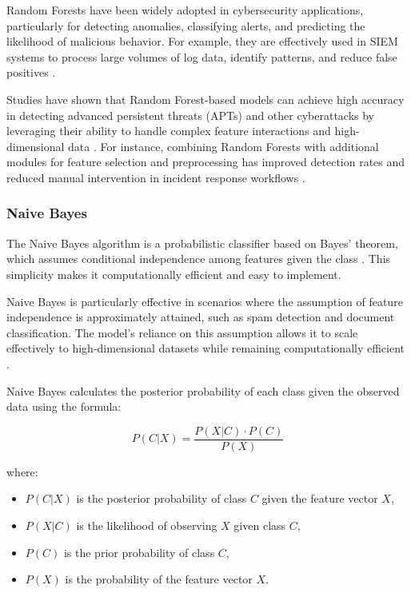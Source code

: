 Random Forests have been widely adopted in cybersecurity applications, particularly for detecting anomalies, classifying alerts, and predicting the likelihood of malicious behavior. 
For example, they are effectively used in \gls{SIEM} systems to process large volumes of log data, identify patterns, and reduce false positives \parencite{Farooq2018, Ali2024}. 

Studies have shown that Random Forest-based models can achieve high accuracy in detecting advanced persistent threats (APTs) and other cyberattacks by leveraging their ability to handle complex feature interactions and high-dimensional data \parencite{Ali2024}. 
For instance, combining Random Forests with additional modules for feature selection and preprocessing has improved detection rates and reduced manual intervention in incident response workflows \parencite{Nila2020}.

\subsubsection{Naive Bayes}

The Naive Bayes algorithm is a probabilistic classifier based on Bayes' theorem, which assumes conditional independence among features given the class \parencite{Chandra2016}.
This simplicity makes it computationally efficient and easy to implement. 

Naive Bayes is particularly effective in scenarios where the assumption of feature independence is approximately attained, such as spam detection and document classification. 
The model's reliance on this assumption allows it to scale effectively to high-dimensional datasets while remaining computationally efficient \parencite{Chandra2016}.

Naive Bayes calculates the posterior probability of each class given the observed data using the formula:

\begin{equation}
P(C|X) = \frac{P(X|C) \cdot P(C)}{P(X)}
\end{equation}

where:
\begin{itemize}
    \item \( P(C|X) \) is the posterior probability of class \( C \) given the feature vector \( X \),
    \item \( P(X|C) \) is the likelihood of observing \( X \) given class \( C \),
    \item \( P(C) \) is the prior probability of class \( C \),
    \item \( P(X) \) is the probability of the feature vector \( X \).
\end{itemize}


